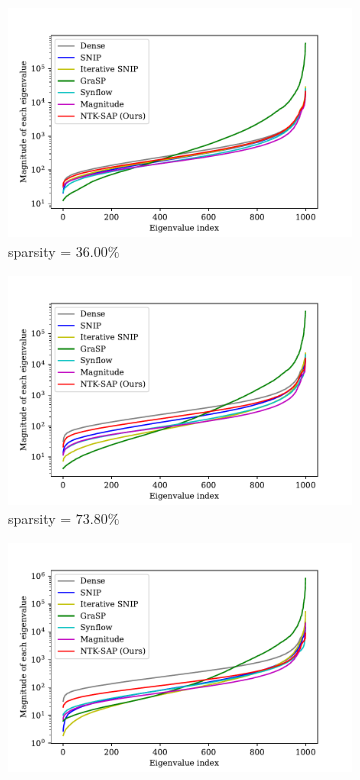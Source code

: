 \documentclass{article} %
\begin{document}
\begin{figure}
  \centering
  \begin{subfigure}[b]{.49\textwidth}
    \includegraphics[width=\textwidth]{plots/nips_rebuttal/init/comparison2.0_finalfull.pdf}
  \caption{\small sparsity = $36.00\%$}
  \label{fig:appendix-eig-init-2}
  \end{subfigure}
  \begin{subfigure}[b]{.49\textwidth}
    \includegraphics[width=\textwidth]{plots/nips_rebuttal/init/comparison6.0_finalfull.pdf}
   \caption{\small sparsity = $73.80\%$}
   \label{fig:appendix-eig-init-6}
  \end{subfigure}
  \begin{subfigure}[b]{.49\textwidth}
    \includegraphics[width=\textwidth]{plots/nips_rebuttal/init/comparison10.0_finalfull.pdf}

\end{subfigure}
\end{figure}
\end{document}
